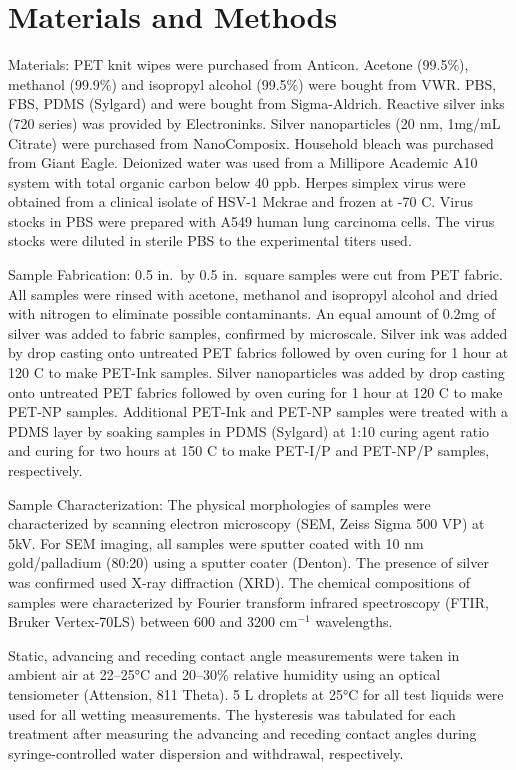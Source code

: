 \documentclass[10pt,letterpaper]{article}
\begin{document}
\section*{Materials and Methods}
Materials: PET knit wipes were purchased from Anticon. Acetone (99.5\%), methanol (99.9\%) and isopropyl alcohol (99.5\%) were bought from VWR.  PBS, FBS, PDMS (Sylgard) and were bought from Sigma-Aldrich. Reactive silver inks (720 series) was provided by Electroninks. Silver nanoparticles (20 nm, 1mg/mL Citrate) were purchased from NanoComposix. Household bleach was purchased from Giant Eagle. Deionized water was used from a Millipore Academic A10 system with total organic carbon below 40 ppb. Herpes simplex virus were obtained from a clinical isolate of HSV-1 Mckrae and frozen at -70 \degree C. Virus stocks in PBS were prepared with A549 human lung carcinoma cells. The virus stocks were diluted in sterile PBS to the experimental titers used.

Sample Fabrication: 0.5 in.~by 0.5 in.~square samples were cut from PET fabric. All samples were rinsed with acetone, methanol and isopropyl alcohol and dried with nitrogen to eliminate possible contaminants. An equal amount of 0.2mg of silver was added to fabric samples, confirmed by microscale. Silver ink was added by drop casting onto untreated PET fabrics followed by oven curing for 1 hour at 120 \degree C to make PET-Ink samples. Silver nanoparticles was added by drop casting onto untreated PET fabrics followed by oven curing for 1 hour at 120 \degree C to make PET-NP samples. Additional PET-Ink and PET-NP samples were treated with a PDMS layer by soaking samples in PDMS (Sylgard) at 1:10 curing agent  ratio and curing for two hours at 150 \degree C to make PET-I/P and PET-NP/P samples, respectively. 


Sample Characterization: The physical morphologies of samples were characterized by scanning electron microscopy (SEM, Zeiss Sigma 500 VP) at 5kV. For SEM imaging, all samples were sputter coated with 10 nm gold/palladium (80:20) using a sputter coater (Denton). The presence of silver was confirmed used X-ray diffraction (XRD). The chemical compositions of samples were characterized by Fourier transform infrared spectroscopy (FTIR, Bruker Vertex-70LS) between 600 and 3200 cm$^{-1}$ wavelengths. 

Static, advancing and receding contact angle measurements were taken in ambient air at 22–25°C and 20–30\% relative humidity using an optical tensiometer (Attension, 811 Theta). 5 \micro L droplets at 25°C for all test liquids were used for all wetting measurements. The hysteresis was tabulated for each treatment after measuring the advancing and receding contact angles during syringe-controlled water dispersion and withdrawal, respectively.
\end{document}
